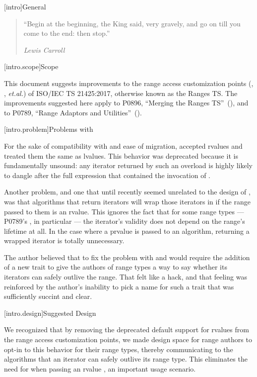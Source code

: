 [intro]{General}

\begin{quote}
``Begin at the beginning, the King said, very gravely, and go on till you come to the end: then stop.''
\begin{flushright}
\textemdash \textit{Lewis Carroll}
\end{flushright}
\end{quote}

[intro.scope]{Scope}

\pnum
This document suggests improvements to the range access customization points
(, , \textit{et.al.}) of ISO/IEC TS 21425:2017, otherwise
known as the Ranges TS. The improvements suggested here apply to P0896,
``Merging the Ranges TS''~(\cite{P0896}), and to P0789, ``Range Adaptors and
Utilities''~(\cite{P0789}).

[intro.problem]{Problems with }

\pnum
For the sake of compatibility with  and ease of migration,
 accepted rvalues and treated them the
same as  lvalues. This behavior was deprecated because it is
fundamentally unsound: any iterator returned by such an overload is highly
likely to dangle after the full expression that contained the invocation of
.

\pnum
Another problem, and one that until recently seemed unrelated to the design of
, was that algorithms that return iterators will wrap those
iterators in  if the range passed
to them is an rvalue. This ignores the fact that for some range types ---
P0789's , in particular --- the iterator's validity does not
depend on the range's lifetime at all. In the case where a prvalue
 is passed to an algorithm, returning a wrapped iterator is
totally unnecessary.

\pnum
The author believed that to fix the problem with  and
 would require the addition of a new trait to give the authors
of range types a way to say whether its iterators can safely outlive the range.
That felt like a hack, and that feeling was reinforced by the author's inability
to pick a name for such a trait that was sufficiently succint and clear.

[intro.design]{Suggested Design}

\pnum
We recognized that by removing the deprecated default support for rvalues from
the range access customization points, we made design space for range authors to
opt-in to this behavior for their range types, thereby communicating to the
algorithms that an iterator can safely outlive its range type. This eliminates
the need for  when passing an rvalue , an
important usage scenario.

